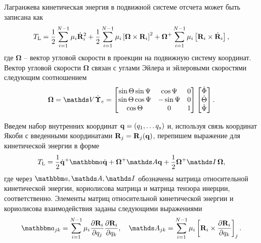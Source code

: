 Лагранжева кинетическая энергия в подвижной системе отсчета может быть записана как \cite{sutcliffe}
\begin{gather}
    T_\text{L} = \frac{1}{2} \sum_{i = 1}^{N-1} \mu_i \dot{\mathbf{R}}_i^2 + \frac{1}{2} \sum_{i = 1}^{N - 1} \mu_i \left[ \boldsymbol{\Omega} \times \mathbf{R}_i \right]^2 + \boldsymbol{\Omega}^{+} \sum_{i = 1}^{N - 1} \mu_i \left[ \mathbf{R}_i \times \dot{\mathbf{R}}_i \right],
\end{gather}
%
где $\boldsymbol{\Omega}$ -- вектор угловой скорости в проекции на подвижную систему координат. Вектор угловой скорости $\boldsymbol{\Omega}$ связан с углами Эйлера и эйлеровыми скоростями следующим соотношением
\begin{gather}
    \boldsymbol{\Omega} = \bbV \dot{\boldsymbol{\Upsilon}}_e = 
    \begin{bmatrix}
        \sin \Theta \sin \Psi & \cos \Psi & 0 \\
        \sin \Theta \cos \Psi & -\sin \Psi & 0 \\
        \cos \Theta & 0 & 1 
    \end{bmatrix}
    \begin{bmatrix}
        \dot{\Phi} \\ \dot{\Theta} \\ \dot{\Psi}
    \end{bmatrix}. \label{polyatom-matrixV}
\end{gather}

Введем набор внутренних координат $\mathbf{q} = \left( q_1, \dots q_s \right)$ и, используя связь координат Якоби с введенными координатами $\mathbf{R}_j = \mathbf{R}_j(\mathbf{q})$, перепишем выражение для кинетической энергии в форме \cite{petrov2015}
\begin{gather}
    \Tl = \frac{1}{2} \dot{\mf{q}}^+ \bba \dot{\mf{q}} + \bOmega^+ \bbA \mf{q} + \frac{1}{2} \bOmega^+ \bbI \, \bOmega, \label{body-fixed-lagrange-energy} 
\end{gather}
%
где через $\bba, \bbA, \bbI$ обозначены матрица относительной кинетической энергии, кориолисова матрица и матрица тензора инерции, соответственно. Элементы матриц относительной кинетической энергии и кориолисова взаимодействия заданы следующими выражениями
\begin{gather}
    \bba_{jk} = \sum_{i = 1}^{N - 1} \mu_i \frac{\partial \mf{R}_i}{\partial q_j} \frac{\partial \mf{R}_i}{\partial q_k}, \quad \bbA_{jk} = \sum_{i = 1}^{N - 1} \mu_i \lsq \mf{R}_i \times \frac{\partial \mf{R}_i}{\partial q_k} \rsq_j. \label{polyatom-kinetic-energy-matrices}
\end{gather}

